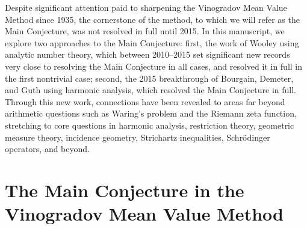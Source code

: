 \documentclass[brochure,english,12pt]{bourbaki}%
\begin{document}
Despite significant attention paid to sharpening the Vinogradov Mean Value Method since 1935, the cornerstone of the method, to which we will refer  as the Main Conjecture, was not resolved in full until 2015. 
In this manuscript, we explore two approaches to the Main Conjecture:
first, the work of Wooley using analytic number theory, which between 2010--2015 set significant new records very close to resolving the Main Conjecture in all cases, and  resolved it in full in the first nontrivial case;  second, the 2015 breakthrough of Bourgain, Demeter, and Guth using harmonic analysis, which resolved the Main Conjecture in full. Through this new work, connections have been revealed to areas  far beyond arithmetic questions such as Waring's problem and the Riemann zeta function, stretching to core questions in harmonic analysis, restriction theory,  geometric measure theory, incidence geometry, Strichartz inequalities, Schr\"{o}dinger operators, and beyond.








\section{The Main Conjecture in the Vinogradov Mean Value Method}
\end{document}
